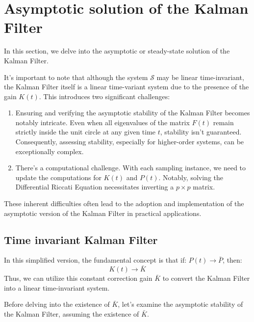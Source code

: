 \section{Asymptotic solution of the Kalman Filter}

In this section, we delve into the asymptotic or steady-state solution of the Kalman Filter.

It's important to note that although the system $\mathcal{S}$ may be linear time-invariant, the Kalman Filter itself is a linear time-variant system due to the presence of the gain $K(t)$. 
This introduces two significant challenges:
\begin{enumerate}
    \item Ensuring and verifying the asymptotic stability of the Kalman Filter becomes notably intricate. 
        Even when all eigenvalues of the matrix $F(t)$ remain strictly inside the unit circle at any given time $t$, stability isn't guaranteed. 
        Consequently, assessing stability, especially for higher-order systems, can be exceptionally complex.
    \item There's a computational challenge. 
        With each sampling instance, we need to update the computations for $K(t)$ and $P(t)$. 
        Notably, solving the Differential Riccati Equation necessitates inverting a $p \times p$ matrix.
\end{enumerate}
These inherent difficulties often lead to the adoption and implementation of the asymptotic version of the Kalman Filter in practical applications.

\subsection{Time invariant Kalman Filter}
In this simplified version, the fundamental concept is that if: $P(t)\rightarrow \bar{P}$, then: 
\[K(t)\rightarrow \bar{K}\]
Thus, we can utilize this constant correction gain $\bar{K}$ to convert the Kalman Filter into a linear time-invariant system.

Before delving into the existence of $\bar{K}$, let's examine the asymptotic stability of the Kalman Filter, assuming the existence of $\bar{K}$.

